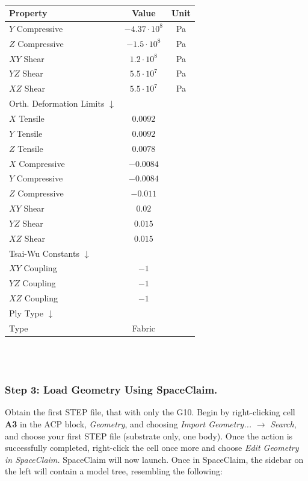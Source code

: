\documentclass{amsdtx}
\begin{document}
\begin{table}[H]
\begin{tabular}{l|c|c}
\end{tabular}~~~~~~
\begin{tabular}{l|c|c}
\bf Property & \bf Value & \bf Unit \\\hline\hline
\quad $Y$ Compressive & $-4.37\cdot 10^8$ & Pa\\\hline
\quad $Z$ Compressive & $-1.5\cdot 10^8$ & Pa\\\hline
\quad $XY$ Shear & $1.2\cdot 10^8$ & Pa\\\hline
\quad $YZ$ Shear & $5.5\cdot 10^7$ & Pa\\\hline
\quad $XZ$ Shear & $5.5\cdot 10^7$ & Pa\\\hline
Orth. Deformation Limits	$\downarrow$ & & \\\hline
\quad $X$ Tensile & $0.0092$ & \\\hline
\quad $Y$ Tensile & $0.0092$ & \\\hline
\quad $Z$ Tensile & $0.0078$ & \\\hline
\quad $X$ Compressive & $-0.0084$ & \\\hline
\quad $Y$ Compressive & $-0.0084$ & \\\hline
\quad $Z$ Compressive & $-0.011$ & \\\hline
\quad $XY$ Shear & $0.02$ & \\\hline
\quad $YZ$ Shear & $0.015$ & \\\hline
\quad $XZ$ Shear & $0.015$ & \\\hline
Tsai-Wu Constants $\downarrow$ & & \\\hline
\quad $XY$ Coupling & $-1$ & \\\hline
\quad $YZ$ Coupling & $-1$ & \\\hline
\quad $XZ$ Coupling & $-1$ & \\\hline
Ply Type $\downarrow$ & & \\\hline
\quad Type & Fabric\\\hline
\end{tabular}
\end{table}
~\\[-2em]
~\\\subsubsection{Step 3: Load Geometry Using SpaceClaim.}
Obtain the first STEP file, that with only the G10. Begin by right-clicking cell {\bf A3} in the ACP block, \textit{Geometry}, and choosing \textit{Import Geometry...} $\rightarrow$ \textit{Search}, and choose your first STEP file (substrate only, one body). Once the action is successfully completed, right-click the cell once more and choose \textit{Edit Geometry in SpaceClaim.} SpaceClaim will now launch. Once in SpaceClaim, the sidebar on the left will contain a model tree, resembling the following:
\end{document}

